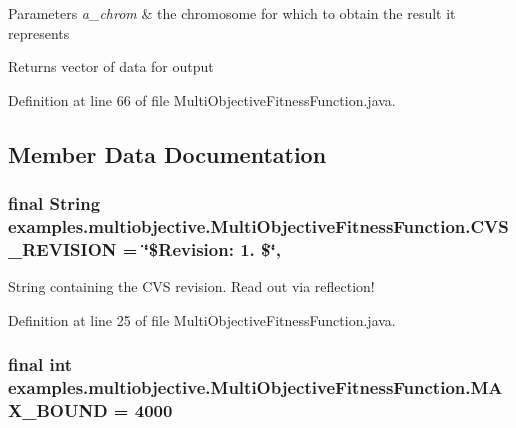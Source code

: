 \begin{DoxyParams}{Parameters}
{\em a\-\_\-chrom} & the chromosome for which to obtain the result it represents\\
\hline
\end{DoxyParams}
\begin{DoxyReturn}{Returns}
vector of data for output 
\end{DoxyReturn}


Definition at line 66 of file Multi\-Objective\-Fitness\-Function.\-java.



\subsection{Member Data Documentation}
\hypertarget{classexamples_1_1multiobjective_1_1_multi_objective_fitness_function_a8d9bbaecd277d52459ffdb916414801a}{
\subsubsection[{C\-V\-S\-\_\-\-R\-E\-V\-I\-S\-I\-O\-N}]{\setlength{\rightskip}{0pt plus 5cm}final String examples.\-multiobjective.\-Multi\-Objective\-Fitness\-Function.\-C\-V\-S\-\_\-\-R\-E\-V\-I\-S\-I\-O\-N = \char`\"{}\$Revision\-: 1. \$\char`\"{}\hspace{0.3cm}{\ttfamily [static]}, {\ttfamily [private]}}}\label{classexamples_1_1multiobjective_1_1_multi_objective_fitness_function_a8d9bbaecd277d52459ffdb916414801a}
String containing the C\-V\-S revision. Read out via reflection! 

Definition at line 25 of file Multi\-Objective\-Fitness\-Function.\-java.

\hypertarget{classexamples_1_1multiobjective_1_1_multi_objective_fitness_function_abe3c154e06efaae92b95114962ed2f36}{
\subsubsection[{M\-A\-X\-\_\-\-B\-O\-U\-N\-D}]{\setlength{\rightskip}{0pt plus 5cm}final int examples.\-multiobjective.\-Multi\-Objective\-Fitness\-Function.\-M\-A\-X\-\_\-\-B\-O\-U\-N\-D = 4000\hspace{0.3cm}{\ttfamily [static]}}}\label{classexamples_1_1multiobjective_1_1_multi_objective_fitness_function_abe3c154e06efaae92b95114962ed2f36}


